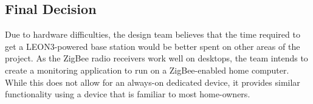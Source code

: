 \subsection{Final Decision}
Due to hardware difficulties, the design team believes that the time
required to get a LEON3-powered base station would be better spent on other
areas of the project. As the ZigBee radio receivers work well on desktops,
the team intends to create a monitoring application to run on a
ZigBee-enabled home computer. While this does not allow for an always-on
dedicated device, it provides similar functionality using a device that is
familiar to most home-owners.

